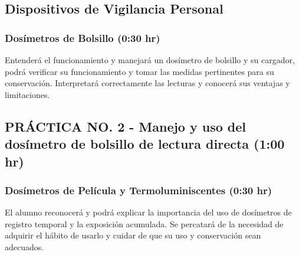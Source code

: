 \subsection{Dispositivos de Vigilancia Personal}
\subsubsection{Dosímetros de Bolsillo (0:30 hr)}
Entenderá el funcionamiento y manejará un dosímetro de bolsillo y su cargador, podrá verificar su funcionamiento y tomar las medidas pertinentes para su conservación. Interpretará correctamente las lecturas y conocerá sus ventajas y limitaciones.

\subsection{PRÁCTICA NO. 2 - Manejo y uso del dosímetro de bolsillo de lectura directa (1:00 hr)}

\subsubsection{Dosímetros de Película y Termoluminiscentes (0:30 hr)}
El alumno reconocerá y podrá explicar la importancia del uso de dosímetros de registro temporal y la exposición acumulada. Se percatará de la necesidad de adquirir el hábito de usarlo y cuidar de que su uso y conservación sean adecuados.
